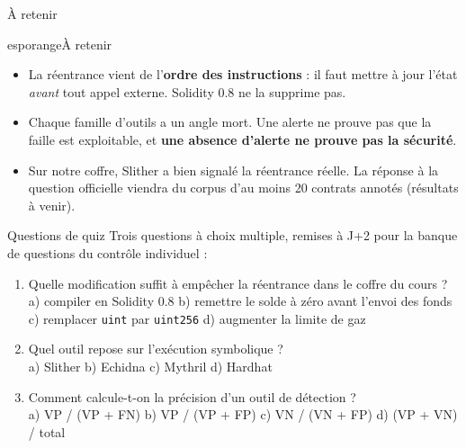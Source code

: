 \documentclass[11pt,aspectratio=169]{beamer}
\begin{document}
\begin{frame}{À retenir}
  \begin{bloc}{esporange}{À retenir}
    \begin{itemize}
      \item La réentrance vient de l'\textbf{ordre des instructions} : il faut mettre à jour l'état \emph{avant} tout appel externe. Solidity 0.8 ne la supprime pas.
      \item Chaque famille d'outils a un angle mort. Une alerte ne prouve pas que la faille est exploitable, et \textbf{une absence d'alerte ne prouve pas la sécurité}.
      \item Sur notre coffre, Slither a bien signalé la réentrance réelle. La réponse à la question officielle viendra du corpus d'au moins 20 contrats annotés (résultats à venir).
    \end{itemize}
  \end{bloc}
\end{frame}

\begin{frame}{Questions de quiz}
  \small
  Trois questions à choix multiple, remises à J+2 pour la banque de questions du contrôle individuel :
  \vspace{4pt}
  \begin{enumerate}
    \item Quelle modification suffit à empêcher la réentrance dans le coffre du cours ?\\[1pt]
      {\footnotesize a) compiler en Solidity 0.8 \quad b) remettre le solde à zéro avant l'envoi des fonds\\
      c) remplacer \texttt{uint} par \texttt{uint256} \quad d) augmenter la limite de gaz}
    \item Quel outil repose sur l'exécution symbolique ?\\[1pt]
      {\footnotesize a) Slither \quad b) Echidna \quad c) Mythril \quad d) Hardhat}
    \item Comment calcule-t-on la précision d'un outil de détection ?\\[1pt]
      {\footnotesize a) VP / (VP + FN) \quad b) VP / (VP + FP) \quad c) VN / (VN + FP) \quad d) (VP + VN) / total}
  \end{enumerate}
\end{frame}
\end{document}
